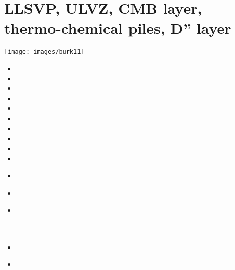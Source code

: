 \section{LLSVP, ULVZ, CMB layer, thermo-chemical piles, D'' layer}

\begin{center}
\texttt{[image: images/burk11]}\cite{burk11}
\end{center}

\begin{scriptsize}
\begin{itemize}
\item[\nineteeneighty]       
\item[\nineteeneightysix]    
\item[\nineteeneightyeight]  
\item[\nineteeneightynine]   
\item[\nineteenninetyfour]   
\item[\nineteenninetysix]    
\item[\nineteenninetyseven]  
\item[\nineteenninetyeight]  
\item[\twothousand]
\item[\twothousandone]       
\item[\twothousandtwo]       
 \\
\item[\twothousandfour]      
 \\
\item[\twothousandfive]      
 \\
 \\
 \\
\item[\twothousandsix]       
\item[\twothousandseven]     
\\
 \\

\end{itemize}
\end{scriptsize}

